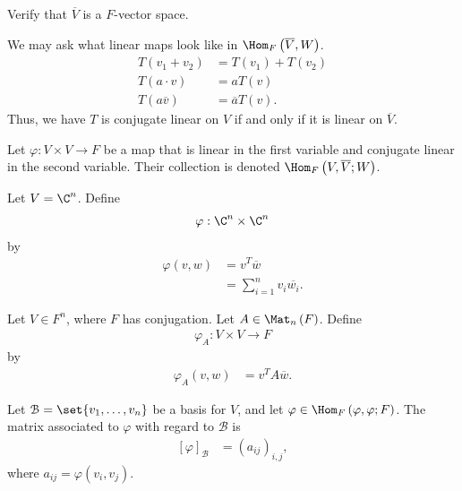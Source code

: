 \documentclass[10pt]{mypackage}
\begin{document}
  \begin{exercise}
    Verify that $\overline{V}$ is a $F$-vector space.
  \end{exercise}
  We may ask what linear maps look like in $\Hom_{F}\left(\overline{V},W\right)$. 
  \begin{align*}
    T\left(v_1 + v_2\right) &= T\left(v_1\right) + T\left(v_2\right)\\
    T\left(a\cdot v\right) &= aT\left(v\right)\\
    T\left(a\overline{v}\right) &= \overline{a}T\left(v\right).
  \end{align*}
  Thus, we have $T$ is conjugate linear on $V$ if and only if it is linear on $\overline{V}$.
  \begin{definition}
    Let $\varphi: V\times V \rightarrow F$ be a map that is linear in the first variable and conjugate linear in the second variable. Their collection is denoted $\Hom_{F}\left(V,\overline{V};W\right)$.
  \end{definition}
  \begin{example}
    Let $V = \C^n$. Define
    \begin{align*}
      \varphi: \C^n\times \C^n
    \end{align*}
    by
    \begin{align*}
      \varphi\left(v,w\right) &= v^{T}\overline{w}\\
                              &= \sum_{i=1}^{n}v_i\overline{w_i}.
    \end{align*}
  \end{example}
  \begin{example}
    Let $V\in F^{n}$, where $F$ has conjugation. Let $A\in \Mat_{n}\left(F\right)$. Define
    \begin{align*}
      \varphi_{A}: V\times V\rightarrow F
    \end{align*}
    by
   \begin{align*}
     \varphi_{A}\left(v,w\right) &=v^{T} A \overline{w}.
   \end{align*}
  \end{example}
  \begin{definition}
    Let $\mathcal{B} = \set{v_1,\dots,v_n}$ be a basis for $V$, and let $\varphi\in \Hom_{F}\left(\varphi,\varphi;F\right)$. The matrix associated to $\varphi$ with regard to $\mathcal{B}$ is
    \begin{align*}
      \left[\varphi\right]_{\mathcal{B}} &= \left(a_{ij}\right)_{i,j},
    \end{align*}
    where $a_{ij} = \varphi\left(v_i,v_j\right)$.
  \end{definition}
\end{document}
